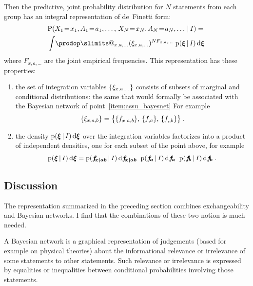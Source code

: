 \documentclass[\ifafour a4paper,12pt,\else a5paper,10pt,\fi%
onecolumn,oneside,article,%
british%
]{memoir}
\makeatletter
\theoremstyle{remark}
\theoremstyle{innote}
\def\prod{\DOTSI\prodop\slimits@}
\newcommand*{\di}{\mathrm{d}}%
\DeclarePairedDelimiter\set{\{}{\}}
\newcommand*{\pf}{\mathrm{p}}%
\newcommand*{\p}{\mathrm{P}}%
\renewcommand*{\|}[1][]{\nonscript\,#1\vert\nonscript\,\mathopen{}}
\renewcommand*{\=}{\TextOrMath\texteq\eq}
\newcommand*{\X}[1]{X_{#1}}
\newcommand*{\x}[1]{x_{#1}}
\newcommand*{\A}[1]{A_{#1}}
\newcommand*{\va}[1]{a_{#1}}
\newcommand*{\ff}[1]{f_{#1}}
\newcommand*{\ffb}[1]{\bm{f_{\!#1}}}
\newcommand*{\FF}[1]{F_{#1}}
\newcommand*{\bcond}[1][]{\nonscript\,#1\bm{\vert}\nonscript\;\mathopen{}}
\makeatother
\begin{document}
Then the predictive, joint probability distribution for $N$ statements from each
group has an integral representation of de~Finetti form:
\begin{multline}
  \label{eq:general_form}
  \p( \X{1}\=\x{1}, \A{1}\=\va{1}, \dotsc,\,
   \X{N}\=\x{N}, \A{N}\=\va{N}, \dotsc \| I) ={}\\
     \int\!\prod_{x,a,\dotsc}
     (\xi_{x,a,\dotsc})^{N \FF{x,a,\dotsc}}\;%
\pf(\bm{\xi}\|I)\,\di\bm{\xi} 
\end{multline}
where $\FF{x,a,\dotsc}$ are the joint empirical frequencies. This
representation has these properties:
\begin{enumerate}[label=\Roman*.]
\item the set of integration variables $\set{\xi_{x,a,\dotsc}}$ consists of
  subsets of marginal and conditional distributions: the same that would
  formally be associated with the Bayesian network of
  point~\ref{item:assu_bayesnet} For example
  \[\set{\xi_{x,a,b}} = \set[\big]{\set{\ff{x \bcond a,b}},\,
    \set{\ff{,a}},\, \set{\ff{,,b}}}\;.\]
\item the density $\pf(\bm{\xi}\|I)\,\di\bm{\xi}$ over the integration
  variables factorizes into a product of independent densities, one for
  each subset of the point above, for example
  \[\pf(\bm{\xi}\|I)\,\di\bm{\xi} =
    \pf(\ffb{x \bcond ab}\|I)\,\di\ffb{x \bcond ab}\;\;
    \pf(\ffb{a}\|I)\,\di\ffb{a}\;\;
    \pf(\ffb{b}\|I)\,\di\ffb{b} \;.
  \]
\end{enumerate}

\subsection{Discussion}
\label{sec:disc_exchbayesnet}

The representation summarized in the preceding section combines
exchangeability and Bayesian networks. I find that the combinations of
these two notion is much needed.

A Bayesian network is a graphical representation of judgements (based for
example on physical theories) about the informational relevance or
irrelevance of some statements to other statements. Such relevance or
irrelevance is expressed by equalities or inequalities between conditional
probabilities involving those statements.
\end{document}
